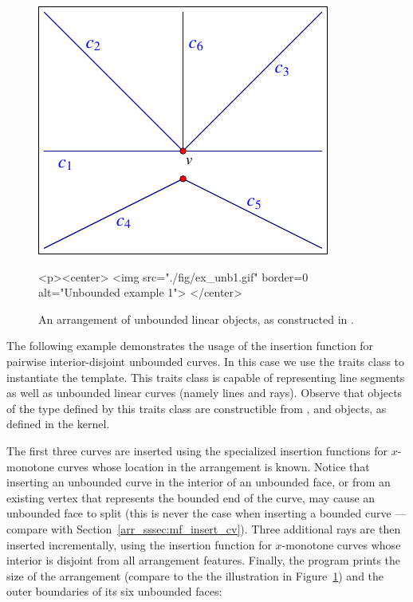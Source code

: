 \begin{figure}[t]
\begin{ccTexOnly}
  \begin{center}
  \includegraphics{Arrangement_2/fig/ex_unb1}
  \end{center}
\end{ccTexOnly}
\begin{ccHtmlOnly}
  <p><center>
  <img src="./fig/ex_unb1.gif" border=0 alt="Unbounded example 1">
  </center>
\end{ccHtmlOnly}
\caption{An arrangement of unbounded linear objects, as constructed
in .\label{arr_fig:ex_unb1}}
\end{figure}

The following example demonstrates the usage of the insertion function
for pairwise interior-disjoint unbounded curves. In this case
we use the traits class  to
instantiate the  template. This traits class is
capable of representing line segments as well as unbounded linear
curves (namely lines and rays). Observe that objects of the
 type defined by this traits class are
constructible from ,  and 
objects, as defined in the kernel.

The first three curves are inserted using the specialized insertion
functions for $x$-monotone curves whose location in the arrangement
is known. Notice that inserting an unbounded curve in the interior
of an unbounded face, or from an existing vertex that represents the
bounded end of the curve, may cause an unbounded face to split (this
is never the case when inserting a bounded curve --- compare with
Section~\ref{arr_sssec:mf_insert_cv}). Three additional rays are then
inserted incrementally, using the insertion function for $x$-monotone
curves whose interior is disjoint from all arrangement features.
Finally, the program prints the size of the arrangement (compare to
the the illustration in Figure~\ref{arr_fig:ex_unb1}) and the outer
boundaries of its six unbounded faces:

